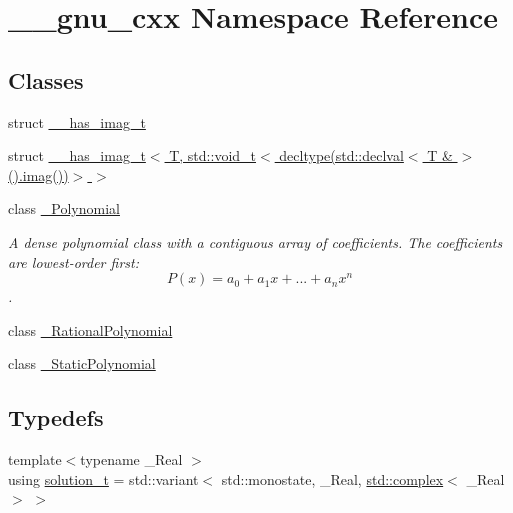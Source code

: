 \hypertarget{namespace____gnu__cxx}{}\section{\+\_\+\+\_\+gnu\+\_\+cxx Namespace Reference}
\label{namespace____gnu__cxx}
\subsection*{Classes}
\begin{DoxyCompactItemize}
\item 
struct \hyperlink{struct____gnu__cxx_1_1____has__imag__t}{\+\_\+\+\_\+has\+\_\+imag\+\_\+t}
\item 
struct \hyperlink{struct____gnu__cxx_1_1____has__imag__t_3_01T_00_01std_1_1void__t_3_01decltype_07std_1_1declval_389ee8aaba7dec2e199e7ad81d6cda763}{\+\_\+\+\_\+has\+\_\+imag\+\_\+t$<$ T, std\+::void\+\_\+t$<$ decltype(std\+::declval$<$ T \& $>$().\+imag())$>$ $>$}
\item 
class \hyperlink{class____gnu__cxx_1_1__Polynomial}{\+\_\+\+Polynomial}
\begin{DoxyCompactList}\small\item\em A dense polynomial class with a contiguous array of coefficients. The coefficients are lowest-\/order first\+: \[ P(x) = a_0 + a_1 x + ... + a_n x^n \]. \end{DoxyCompactList}\item 
class \hyperlink{class____gnu__cxx_1_1__RationalPolynomial}{\+\_\+\+Rational\+Polynomial}
\item 
class \hyperlink{class____gnu__cxx_1_1__StaticPolynomial}{\+\_\+\+Static\+Polynomial}
\end{DoxyCompactItemize}
\subsection*{Typedefs}
\begin{DoxyCompactItemize}
\item 
{\footnotesize template$<$typename \+\_\+\+Real $>$ }\\using \hyperlink{namespace____gnu__cxx_ae20ea642de50eb361074c62676b0159c}{solution\+\_\+t} = std\+::variant$<$ std\+::monostate, \+\_\+\+Real, \hyperlink{classstd_1_1complex}{std\+::complex}$<$ \+\_\+\+Real $>$ $>$
\end{DoxyCompactItemize}
